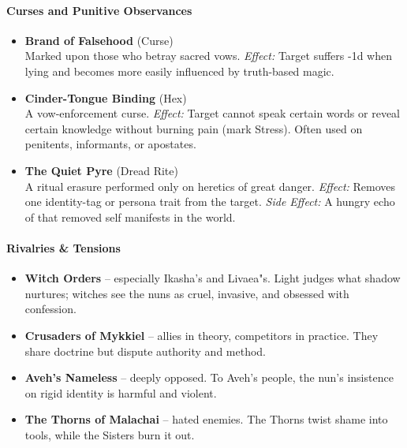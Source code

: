\documentclass[11pt]{book}
\begin{document}
\paragraph{Curses and Punitive Observances}

\begin{itemize}[leftmargin=1.5em]

    \item \textbf{Brand of Falsehood} (Curse) \\
    Marked upon those who betray sacred vows.  
    \emph{Effect:} Target suffers -1d when lying and becomes more easily  
    influenced by truth-based magic.

    \item \textbf{Cinder-Tongue Binding} (Hex) \\
    A vow-enforcement curse.  
    \emph{Effect:} Target cannot speak certain words or reveal  
    certain knowledge without burning pain (mark Stress).  
    Often used on penitents, informants, or apostates.

    \item \textbf{The Quiet Pyre} (Dread Rite) \\
    A ritual erasure performed only on heretics of great danger.  
    \emph{Effect:} Removes one identity-tag or persona trait from the target.  
    \emph{Side Effect:} A hungry echo of that removed self manifests in the world.

\end{itemize}

\paragraph{Rivalries \& Tensions}

\begin{itemize}[leftmargin=1.5em]
    \item \textbf{Witch Orders} -- especially Ikasha's and Livaea"s.  
    Light judges what shadow nurtures; witches see the nuns as  
    cruel, invasive, and obsessed with confession.

    \item \textbf{Crusaders of Mykkiel} -- allies in theory, competitors in practice.  
    They share doctrine but dispute authority and method.

    \item \textbf{Aveh's Nameless} -- deeply opposed.  
    To Aveh's people, the nun's insistence on rigid identity  
    is harmful and violent.

    \item \textbf{The Thorns of Malachai} -- hated enemies.  
    The Thorns twist shame into tools, while the Sisters burn it out.  
\end{itemize}
\end{document}
